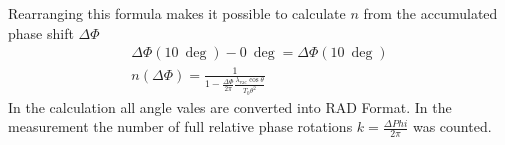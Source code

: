 Rearranging this formula makes it possible to calculate $n$ from the accumulated phase shift $\Delta \Phi$
\begin{align}
	\Delta \Phi (\qty{10}{\deg})- \qty{0}{\deg} =\Delta \Phi (\qty{10}{\deg}) \\
	n (\Delta \Phi) = \frac{1}{1-\frac{\Delta\Phi}{2\pi} \frac{\lambda_\text{vac}\cos{\theta}}{T_0 \theta^2}}
\end{align}
In the calculation all angle vales are converted into RAD Format.
In the measurement the number of full relative phase rotations 
$k = \frac{\Delta Phi}{2 \pi}$ was counted.




